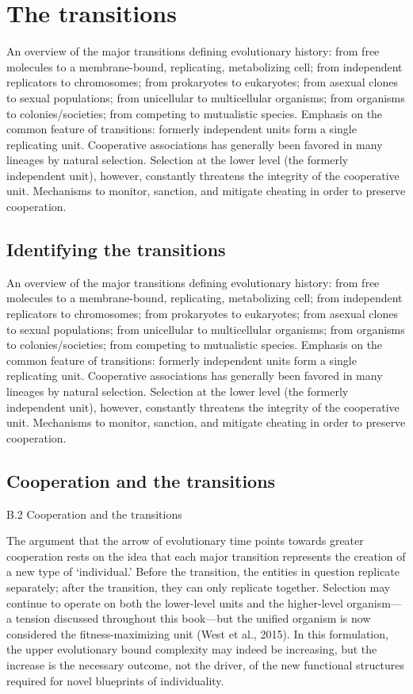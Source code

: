 \documentclass{tufte-book} %
\begin{document}
\section{The transitions}

An overview of the major transitions defining evolutionary history: from free molecules to a membrane-bound, replicating, metabolizing cell; from independent replicators to chromosomes; from prokaryotes to eukaryotes; from asexual clones to sexual populations; from unicellular to multicellular organisms; from organisms to colonies/societies; from competing to mutualistic species. Emphasis on the common feature of transitions: formerly independent units form a single replicating unit. Cooperative associations has generally been favored in many lineages by natural selection. Selection at the lower level (the formerly independent unit), however, constantly threatens the integrity of the cooperative unit. Mechanisms to monitor, sanction, and mitigate cheating in order to preserve cooperation.

\subsection{Identifying the transitions}

An overview of the major transitions defining evolutionary history: from free molecules to a membrane-bound, replicating, metabolizing cell; from independent replicators to chromosomes; from prokaryotes to eukaryotes; from asexual clones to sexual populations; from unicellular to multicellular organisms; from organisms to colonies/societies; from competing to mutualistic species. Emphasis on the common feature of transitions: formerly independent units form a single replicating unit. Cooperative associations has generally been favored in many lineages by natural selection. Selection at the lower level (the formerly independent unit), however, constantly threatens the integrity of the cooperative unit. Mechanisms to monitor, sanction, and mitigate cheating in order to preserve cooperation.

\subsection{Cooperation and the transitions}

B.2  Cooperation and the transitions

The argument that the arrow of evolutionary time points towards greater cooperation rests on the idea that each major transition represents the creation of a new type of ‘individual.’ Before the transition, the entities in question replicate separately; after the transition, they can only replicate together. Selection may continue to operate on both the lower-level units and the higher-level organism—a tension discussed throughout this book—but the unified organism is now considered the fitness-maximizing unit (West et al., 2015). In this formulation, the upper evolutionary bound complexity may indeed be increasing, but the increase is the necessary outcome, not the driver, of the new functional structures required for novel blueprints of individuality.
\end{document}
